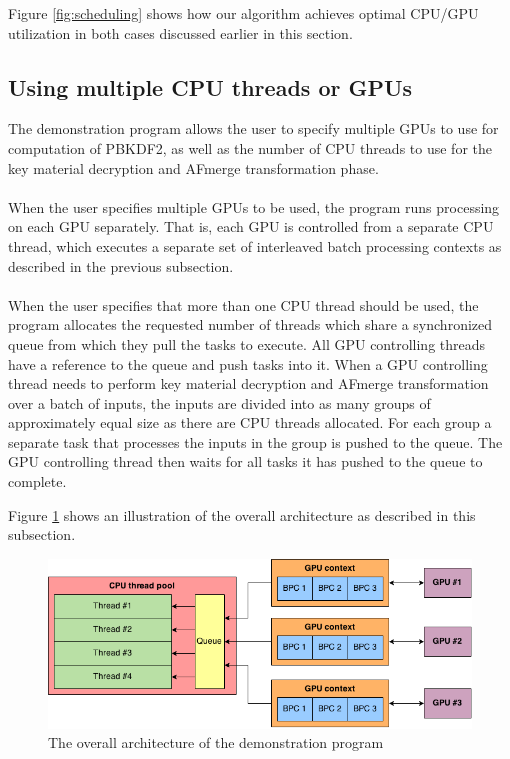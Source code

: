 \documentclass[12pt,oneside]{fithesis2}
\begin{document}
      Figure \ref{fig:scheduling} shows how our algorithm achieves optimal CPU/GPU utilization in both cases discussed earlier in this section.
      
      \subsection{Using multiple CPU threads or GPUs}
      The demonstration program allows the user to specify multiple GPUs to use for computation of PBKDF2, as well as the number of CPU threads to use for the key material decryption and AFmerge transformation phase.
      
      \paragraph*{}
      When the user specifies multiple GPUs to be used, the program runs processing on each GPU separately. That is, each GPU is controlled from a separate CPU thread, which executes a separate set of interleaved batch processing contexts as described in the previous subsection.
      
      \paragraph*{}
      When the user specifies that more than one CPU thread should be used, the program allocates the requested number of threads which share a synchronized queue from which they pull the tasks to execute. All GPU controlling threads have a reference to the queue and push tasks into it. When a GPU controlling thread needs to perform key material decryption and AFmerge transformation over a batch of inputs, the inputs are divided into as many groups of approximately equal size as there are CPU threads allocated. For each group a separate task that processes the inputs in the group is pushed to the queue. The GPU controlling thread then waits for all tasks it has pushed to the queue to complete.
      
      Figure \ref{fig:lukscrackArch} shows an illustration of the overall architecture as described in this subsection.
      
      \begin{figure}
        \centering
        \includegraphics[width=\linewidth]{images/lukscrack-gpu-architecture.png}
        \caption{The overall architecture of the demonstration program}
        \label{fig:lukscrackArch}
      \end{figure}
      
\end{document}
